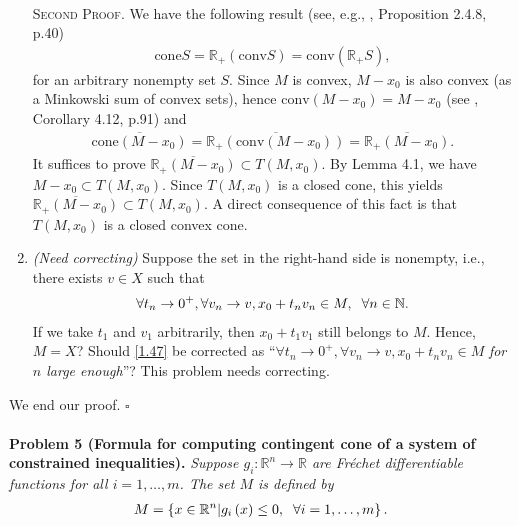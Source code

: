 \documentclass[a4paper]{article}
\numberwithin{equation}{section}
\begin{document}
\begin{enumerate}
\\
\textsc{Second Proof.} We have the following result (see, e.g., \cite{2}, Proposition 2.4.8, p.40)
\begin{align}
\mbox{cone}S = {\mathbb{R}_ + }\left( {\mbox{conv}S} \right) = \mbox{conv} \left( {{\mathbb{R}_ + }S} \right),
\end{align}
for an arbitrary nonempty set $S$. Since $M$ is convex, $M-x_0$ is also convex (as a Minkowski sum of convex sets), hence $\mbox{conv}\left( {M - {x_0}} \right) = M - {x_0}$ (see \cite{1}, Corollary 4.12, p.91) and 
\begin{align}
\overline {\mbox{cone}\left( {M - {x_0}} \right)}  = \overline {{\mathbb{R}_ + }\left( {\mbox{conv}\left( {M - {x_0}} \right)} \right)}  = \overline {{\mathbb{R}_ + }\left( {M - {x_0}} \right)}.
\end{align}
It suffices to prove $\overline {{\mathbb{R}_ + }\left( {M - {x_0}} \right)}  \subset T\left( {M,{x_0}} \right)$. By Lemma 4.1, we have $M - {x_0} \subset T\left( {M,{x_0}} \right)$. Since $T\left(M,x_0\right)$ is a closed cone, this yields $\overline {{\mathbb{R}_ + }\left( {M - {x_0}} \right)}  \subset T\left( {M,{x_0}} \right)$. A direct consequence of this fact is that $T\left(M,x_0\right)$ is a closed convex cone.
\item \textit{(Need correcting)} Suppose the set in the right-hand side is nonempty, i.e., there exists $v\in X$ such that 
\begin{align}
\label{1.47}
\forall {t_n} \to {0^ + },\forall {v_n} \to v,{x_0} + {t_n}{v_n} \in M,\hspace{0.2cm}\forall n \in \mathbb{N}.
\end{align}
If we take $t_1$ and $v_1$ arbitrarily, then $x_0+t_1 v_1$ still belongs to $M$. Hence, $M=X$? Should \eqref{1.47} be corrected as ``$\forall {t_n} \to {0^ + },\forall {v_n} \to v,{x_0} + {t_n}{v_n} \in M$ \textit{for $n$ large enough}''? This problem needs correcting.
\end{enumerate}
We end our proof. \hfill $\square$\\
\\
\textbf{Problem 5 (Formula for computing contingent cone of a system of constrained inequalities).} \textit{Suppose $g_i:\mathbb{R}^n \to \mathbb{R}$ are Fr\'{e}chet differentiable functions for all $i=1,\ldots,m$. The set $M$ is defined by}
\begin{align}
M = \left\{ {x \in {\mathbb{R}^n}|{g_i}\left( x \right) \le 0,\hspace{0.2cm}\forall i = 1, \ldots ,m} \right\}.
\end{align}
\end{document}
